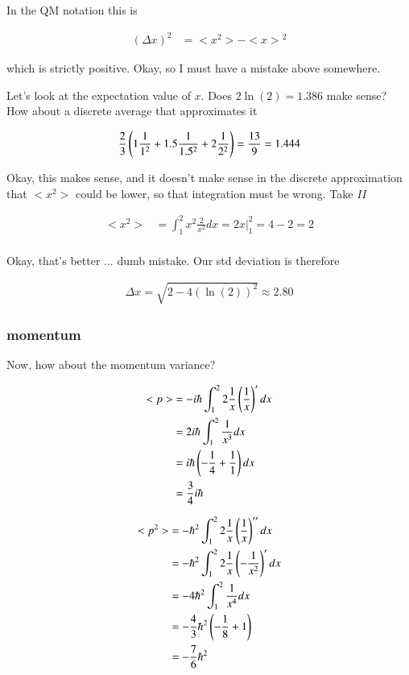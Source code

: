 \documentclass{article}
\begin{document}
In the QM notation this is

\begin{align*}
(\Delta x)^2 &= <x^2> - {<x>}^2
\end{align*}

which is strictly positive.  Okay, so I must have a mistake above somewhere.

Let's look at the expectation value of $x$.  Does $2 \ln(2) = 1.386$ make sense?  How about a discrete average that approximates it

\begin{align*}
\frac{2}{3}\left( 1 \frac{1}{1^2} + 1.5 \frac{1}{1.5^2} + 2 \frac{1}{2^2} \right) = \frac{13}{9} = 1.444
\end{align*}

Okay, this makes sense, and it doesn't make sense in the discrete approximation that $<x^2>$ could be lower, so that integration
must be wrong.  Take $II$

\begin{align*}
<x^2> &= \int_1^2 x^2 \frac{2}{x^2} dx = {\left.2x\right\vert}_1^2 = 4 - 2 = 2 \\
\end{align*}

Okay, that's better ... dumb mistake. Our std deviation is therefore

\begin{align*}
\Delta x = \sqrt{2 - 4 (\ln(2))^2} \approx 2.80
\end{align*}

\subsubsection{ momentum }

Now, how about the momentum variance?

\begin{align*}
<p> 
&= -i \hbar \int_1^2 2 \frac{1}{x} \left(\frac{1}{x}\right)' dx \\
&= 2 i \hbar \int_1^2 \frac{1}{x^3} dx \\
&= i \hbar \left(-\frac{1}{4} + \frac{1}{1}\right) dx \\
&= \frac{3}{4} i \hbar
\end{align*}

\begin{align*}
<p^2> 
&= -\hbar^2 \int_1^2 2 \frac{1}{x} \left(\frac{1}{x}\right)'' dx \\
&= -\hbar^2 \int_1^2 2 \frac{1}{x} \left(-\frac{1}{x^2}\right)' dx \\
&= - 4 \hbar^2 \int_1^2 \frac{1}{x^4} dx \\
&= - \frac{4}{3} \hbar^2 \left( -\frac{1}{8} + 1 \right) \\
&= - \frac{7}{6} \hbar^2
\end{align*}
\end{document}
